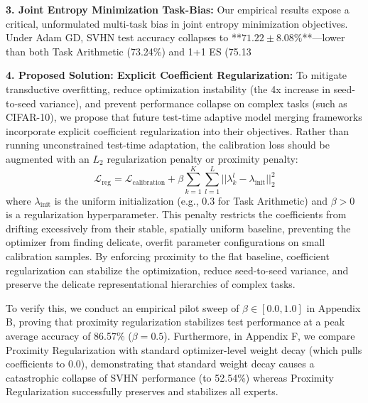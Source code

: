 \textbf{3. Joint Entropy Minimization Task-Bias:}
Our empirical results expose a critical, unformulated multi-task bias in joint entropy minimization objectives. Under Adam GD, SVHN test accuracy collapses to **$71.22 \pm 8.08\%$**—lower than both Task Arithmetic (73.24\%) and 1+1 ES (75.13%

\textbf{4. Proposed Solution: Explicit Coefficient Regularization:}
To mitigate transductive overfitting, reduce optimization instability (the 4x increase in seed-to-seed variance), and prevent performance collapse on complex tasks (such as CIFAR-10), we propose that future test-time adaptive model merging frameworks incorporate explicit coefficient regularization into their objectives. Rather than running unconstrained test-time adaptation, the calibration loss should be augmented with an $L_2$ regularization penalty or proximity penalty:
\begin{equation}
    \mathcal{L}_{\text{reg}} = \mathcal{L}_{\text{calibration}} + \beta \sum_{k=1}^K \sum_{l=1}^L ||\lambda^l_k - \lambda_{\text{init}}||^2_2
\end{equation}
where $\lambda_{\text{init}}$ is the uniform initialization (e.g., 0.3 for Task Arithmetic) and $\beta > 0$ is a regularization hyperparameter. This penalty restricts the coefficients from drifting excessively from their stable, spatially uniform baseline, preventing the optimizer from finding delicate, overfit parameter configurations on small calibration samples. By enforcing proximity to the flat baseline, coefficient regularization can stabilize the optimization, reduce seed-to-seed variance, and preserve the delicate representational hierarchies of complex tasks. 

To verify this, we conduct an empirical pilot sweep of $\beta \in [0.0, 1.0]$ in Appendix B, proving that proximity regularization stabilizes test performance at a peak average accuracy of 86.57\% ($\beta = 0.5$). Furthermore, in Appendix F, we compare Proximity Regularization with standard optimizer-level weight decay (which pulls coefficients to 0.0), demonstrating that standard weight decay causes a catastrophic collapse of SVHN performance (to 52.54\%) whereas Proximity Regularization successfully preserves and stabilizes all experts.
